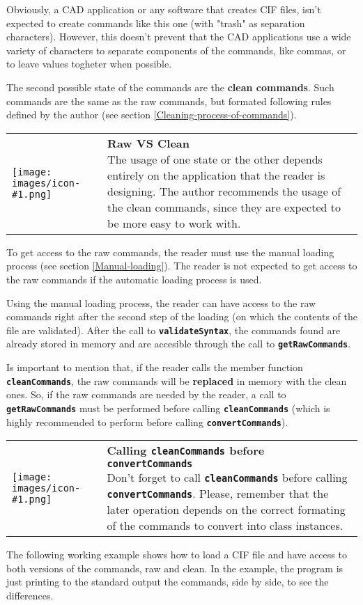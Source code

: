 \documentclass[11pt,twoside,openany,x11names,svgnames]{memoir}
\makeatletter
\newcommand{\IconNote}[3]
{
	\begin{table}[ht]
	\begin{tabular}{ lm{\dimexpr\textwidth-8\tabcolsep-\wd0}@{}}
		\toprule
		\texttt{[image: images/icon-\#1.png]}
		&
		\parbox[t]{155mm}{
		\textbf{#2} \\
		#3
		}
	\end{tabular}
\end{table}
}
\makeatother
\begin{document}
Obviously, a CAD application or any software that creates CIF files, isn't expected to create commands like this one (with "trash" as separation characters). However, this doesn't prevent that the CAD applications use a wide variety of characters to separate components of the commands, like commas, or to leave values togheter when possible.

The second possible state of the commands are the \textbf{clean commands}. Such commands are the same as the raw commands, but formated following rules defined by the author (see section \ref{Cleaning-process-of-commands}).

\IconNote
	{info}
	{Raw VS Clean}
	{The usage of one state or the other depends entirely on the application that the reader is designing. The author recommends the usage of the clean commands, since they are expected to be more easy to work with.}
	
To get access to the raw commands, the reader must use the manual loading process (see section \ref{Manual-loading}). The reader is not expected to get access to the raw commands if the automatic loading process is used.

Using the manual loading process, the reader can have access to the raw commands right after the second step of the loading (on which the contents of the file are validated). After the call to \textbf{\texttt{validateSyntax}}, the commands found are already stored in memory and are accesible through the call to \textbf{\texttt{getRawCommands}}.

Is important to mention that, if the reader calls the member function \textbf{\texttt{cleanCommands}}, the raw commands will be \textbf{replaced} in memory with the clean ones. So, if the raw commands are needed by the reader, a call to \textbf{\texttt{getRawCommands}} must be performed before calling \textbf{\texttt{cleanCommands}} (which is highly recommended to perform before calling \textbf{\texttt{convertCommands}}).

\IconNote
	{warning}
	{Calling \textbf{\texttt{cleanCommands}} before \textbf{\texttt{convertCommands}}}
	{Don't forget to call \textbf{\texttt{cleanCommands}} before calling \textbf{\texttt{convertCommands}}. Please, remember that the later operation depends on the correct formating of the commands to convert into class instances.}

The following working example shows how to load a CIF file and have access to both versions of the commands, raw and clean. In the example, the program is just printing to the standard output the commands, side by side, to see the differences.
\end{document}
